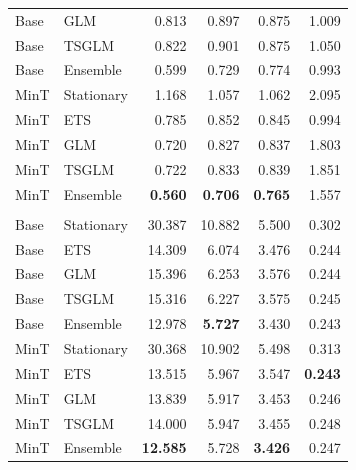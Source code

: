 \documentclass[
  authoryear,
  preprint,
  3p]{elsarticle}
\begin{document}
\begin{table}
\begin{tabular}{llrrrr}
\hspace{1em}Base & GLM & 0.813 & 0.897 & 0.875 & 1.009\\
\hspace{1em}Base & TSGLM & 0.822 & 0.901 & 0.875 & 1.050\\
\hspace{1em}Base & Ensemble & 0.599 & 0.729 & 0.774 & 0.993\\
\hspace{1em}MinT & Stationary & 1.168 & 1.057 & 1.062 & 2.095\\
\hspace{1em}MinT & ETS & 0.785 & 0.852 & 0.845 & 0.994\\
\hspace{1em}MinT & GLM & 0.720 & 0.827 & 0.837 & 1.803\\
\hspace{1em}MinT & TSGLM & 0.722 & 0.833 & 0.839 & 1.851\\
\hspace{1em}MinT & Ensemble & \textbf{0.560} & \textbf{0.706} & \textbf{0.765} & 1.557\\
\addlinespace[0.3em]
\hline
\multicolumn{6}{l}{\textbf{CRPS}}\\
\hspace{1em}Base & Stationary & 30.387 & 10.882 & 5.500 & 0.302\\
\hspace{1em}Base & ETS & 14.309 & 6.074 & 3.476 & 0.244\\
\hspace{1em}Base & GLM & 15.396 & 6.253 & 3.576 & 0.244\\
\hspace{1em}Base & TSGLM & 15.316 & 6.227 & 3.575 & 0.245\\
\hspace{1em}Base & Ensemble & 12.978 & \textbf{5.727} & 3.430 & 0.243\\
\hspace{1em}MinT & Stationary & 30.368 & 10.902 & 5.498 & 0.313\\
\hspace{1em}MinT & ETS & 13.515 & 5.967 & 3.547 & \textbf{0.243}\\
\hspace{1em}MinT & GLM & 13.839 & 5.917 & 3.453 & 0.246\\
\hspace{1em}MinT & TSGLM & 14.000 & 5.947 & 3.455 & 0.248\\
\hspace{1em}MinT & Ensemble & \textbf{12.585} & 5.728 & \textbf{3.426} & 0.247\\
\bottomrule
\end{tabular}
\end{table}
\end{document}
